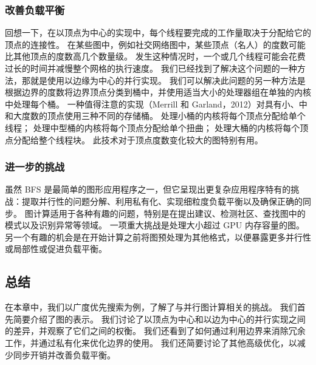 \subsubsection{改善负载平衡}
回想一下，在以顶点为中心的实现中，每个线程要完成的工作量取决于分配给它的顶点的连接性。 在某些图中，例如社交网络图中，某些顶点（名人）的度数可能比其他顶点的度数高几个数量级。 发生这种情况时，一个或几个线程可能会花费过长的时间并减慢整个网格的执行速度。 我们已经找到了解决这个问题的一种方法，那就是使用以边缘为中心的并行实现。 我们可以解决此问题的另一种方法是根据边界的度数将边界顶点分类到桶中，并使用适当大小的处理器组在单独的内核中处理每个桶。 一种值得注意的实现（Merrill 和 Garland，2012）对具有小、中和大度数的顶点使用三种不同的存储桶。 处理小桶的内核将每个顶点分配给单个线程； 处理中型桶的内核将每个顶点分配给单个扭曲； 处理大桶的内核将每个顶点分配给整个线程块。 此技术对于顶点度数变化较大的图特别有用。

\subsubsection{进一步的挑战}
虽然 BFS 是最简单的图形应用程序之一，但它呈现出更复杂应用程序特有的挑战：提取并行性的问题分解、利用私有化、实现细粒度负载平衡以及确保正确的同步。 图计算适用于各种有趣的问题，特别是在提出建议、检测社区、查找图中的模式以及识别异常等领域。 一项重大挑战是处理大小超过 GPU 内存容量的图。 另一个有趣的机会是在开始计算之前将图预处理为其他格式，以便暴露更多并行性或局部性或促进负载平衡。

\subsection{总结}
在本章中，我们以广度优先搜索为例，了解了与并行图计算相关的挑战。 我们首先简要介绍了图的表示。 我们讨论了以顶点为中心和以边为中心的并行实现之间的差异，并观察了它们之间的权衡。 我们还看到了如何通过利用边界来消除冗余工作，并通过私有化来优化边界的使用。 我们还简要讨论了其他高级优化，以减少同步开销并改善负载平衡。